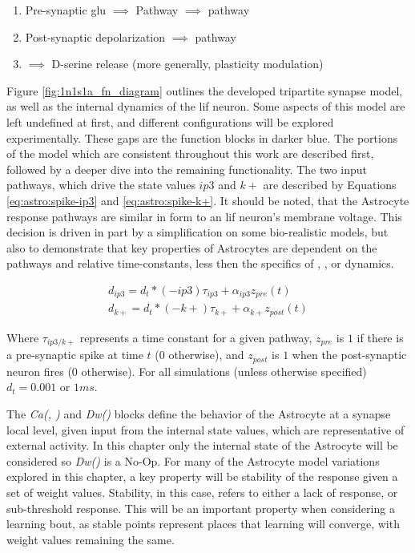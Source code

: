 \begin{enumerate}
  \item Pre-synaptic \Gls{glu} $\implies$ \ipt Pathway $\implies$ \ca pathway
  \item Post-synaptic depolarization \kp $\implies$ \ca pathway
  \item \ca $\implies$ D-serine release (more generally, plasticity modulation)
\end{enumerate}


Figure \ref{fig:1n1s1a_fn_diagram} outlines the developed tripartite synapse
model, as well as the internal dynamics of the \Gls{lif} neuron. Some aspects of this
model are left undefined at first, and different configurations will be explored
experimentally. These gaps are the function blocks in darker blue. The
portions of the model which are consistent throughout this work are described
first, followed by a deeper dive into the remaining functionality. The two input
pathways, which drive the state values $ip3$ and $k+$ are described by Equations
\ref{eq:astro:spike-ip3} and \ref{eq:astro:spike-k+}. It should be noted, that
the Astrocyte response pathways are similar in form to an \Gls{lif} neuron's membrane
voltage. This decision is driven in part by a simplification on some
bio-realistic models, but also to demonstrate that key properties of Astrocytes
are dependent on the pathways and relative time-constants, less then the specifics of
\ca, \ipt, or \kp dynamics.

\begin{align}
  d_{ip3} = d_t * (-ip3)\tau_{ip3} + \alpha_{ip3} z_{pre}(t) \label{eq:astro:spike-ip3} \\
  d_{k+} = d_t * (-k+)\tau_{k+} + \alpha_{k+} z_{post}(t) \label{eq:astro:spike-k+}
\end{align}

Where $\tau_{ip3/k+}$ represents a time constant for a given pathway, $z_{pre}$
is $1$ if there is a pre-synaptic spike at time $t$ ($0$ otherwise), and
$z_{post}$ is $1$ when the post-synaptic neuron fires ($0$ otherwise). For all
simulations (unless otherwise specified) $d_t = 0.001$ or $1ms$.

The \emph{Ca(\ipt, \kp)} and \emph{Dw(\ca)} blocks define the behavior
of the Astrocyte at a synapse local level, given input from the internal state values,
which are representative of external activity. In this chapter only the internal
state of the Astrocyte will be considered so \emph{Dw(\ca)} is a
No-Op. For many of the Astrocyte model variations explored in this chapter, a
key property will be stability of the response given a set of weight
values. Stability, in this case, refers to either a lack of \ca response, or
sub-threshold \ca response. This will be an important property when considering
a learning bout, as stable points represent places that learning will converge,
with weight values remaining the same.

